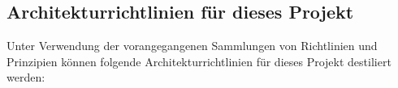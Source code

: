 \subsection{Architekturrichtlinien für dieses Projekt}
Unter Verwendung der vorangegangenen Sammlungen von Richtlinien und Prinzipien können folgende Architekturrichtlinien für dieses Projekt destiliert werden:
